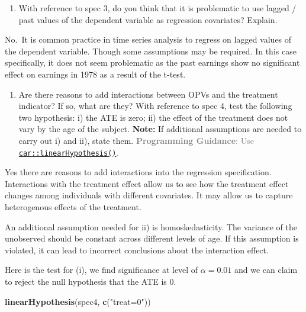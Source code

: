 \documentclass[
]{article}
\newenvironment{Shaded}{\begin{snugshade}}{\end{snugshade}}
\newcommand{\FunctionTok}[1]{\textcolor[rgb]{0.13,0.29,0.53}{\textbf{#1}}}
\newcommand{\NormalTok}[1]{#1}
\newcommand{\StringTok}[1]{\textcolor[rgb]{0.31,0.60,0.02}{#1}}
\providecommand{\tightlist}{%
  \setlength{\itemsep}{0pt}\setlength{\parskip}{0pt}}
\begin{document}
\begin{enumerate}
\def\labelenumi{\alph{enumi}.}
\setcounter{enumi}{2}
\tightlist
\item
  With reference to spec 3, do you think that it is problematic to use
  lagged / past values of the dependent variable as regression
  covariates? Explain.
\end{enumerate}

No.~It is common practice in time series analysis to regress on lagged
values of the dependent variable. Though some assumptions may be
required. In this case specifically, it does not seem problematic as the
past earnings show no significant effect on earnings in 1978 as a result
of the t-test.

\begin{enumerate}
\def\labelenumi{\alph{enumi}.}
\setcounter{enumi}{3}
\tightlist
\item
  Are there reasons to add interactions between OPVs and the treatment
  indicator? If so, what are they? With reference to spec 4, test the
  following two hypothesis: i) the ATE is zero; ii) the effect of the
  treatment does not vary by the age of the subject. \textbf{Note:} If
  additional assumptions are needed to carry out i) and ii), state them.
  \textcolor{gray}{\textbf{Programming Guidance}: Use \href{https://rdrr.io/cran/car/man/linearHypothesis.html}{\texttt{car::linearHypothesis()}}.}
\end{enumerate}

Yes there are reasons to add interactions into the regression
specification. Interactions with the treatment effect allow us to see
how the treatment effect changes among individuals with different
covariates. It may allow us to capture heterogenous effects of the
treatment.

An additional assumption needed for ii) is homoskedasticity. The
variance of the unobserved should be constant across different levels of
age. If this assumption is violated, it can lead to incorrect
conclusions about the interaction effect.

Here is the test for (i), we find significance at level of
\(\alpha = 0.01\) and we can claim to reject the null hypothesis that
the ATE is 0.

\begin{Shaded}
\begin{Highlighting}[]
\FunctionTok{linearHypothesis}\NormalTok{(spec4, }\FunctionTok{c}\NormalTok{(}\StringTok{"treat=0"}\NormalTok{))}
\end{Highlighting}
\end{Shaded}
\end{document}
